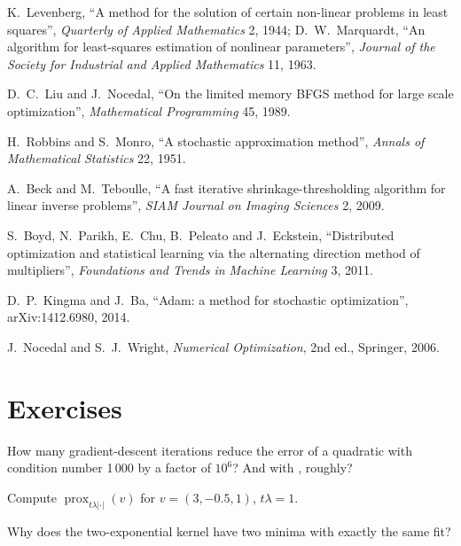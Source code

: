 \begin{omsources}
\item K.~Levenberg, ``A method for the solution of certain non-linear problems in least squares'', \emph{Quarterly of Applied Mathematics} 2, 1944; D.~W.~Marquardt, ``An algorithm for least-squares
estimation of nonlinear parameters'', \emph{Journal of the Society for Industrial and Applied Mathematics} 11, 1963.
\item D.~C.~Liu and J.~Nocedal, ``On the limited memory BFGS method for large scale optimization'', \emph{Mathematical Programming} 45, 1989.
\item H.~Robbins and S.~Monro, ``A stochastic approximation method'', \emph{Annals of Mathematical Statistics} 22, 1951.
\item A.~Beck and M.~Teboulle, ``A fast iterative shrinkage-thresholding algorithm for linear inverse problems'', \emph{SIAM Journal on Imaging Sciences} 2, 2009.
\item S.~Boyd, N.~Parikh, E.~Chu, B.~Peleato and J.~Eckstein, ``Distributed optimization and statistical learning via the alternating direction method of multipliers'', \emph{Foundations and Trends in
Machine Learning} 3, 2011.
\item D.~P.~Kingma and J.~Ba, ``Adam: a method for stochastic optimization'', arXiv:1412.6980, 2014.
\item J.~Nocedal and S.~J.~Wright, \emph{Numerical Optimization}, 2nd ed., Springer, 2006.
\end{omsources}

\section{Exercises}

\begin{exercise}[$\star$]\label{exo:qm:numerical-optimisation-in-practice:1}
How many gradient-descent iterations reduce the error of a quadratic with condition number 1\,000 by a factor of $10^{6}$? And with , roughly?
\end{exercise}

\begin{exercise}[$\star$]\label{exo:qm:numerical-optimisation-in-practice:2}
Compute $\operatorname{prox}_{t\lambda|\cdot|}(v)$ for $v = (3, -0.5, 1)$, $t\lambda = 1$.
\end{exercise}

\begin{exercise}[$\star$]\label{exo:qm:numerical-optimisation-in-practice:3}
Why does the two-exponential kernel have two minima with exactly the same fit?
\end{exercise}

